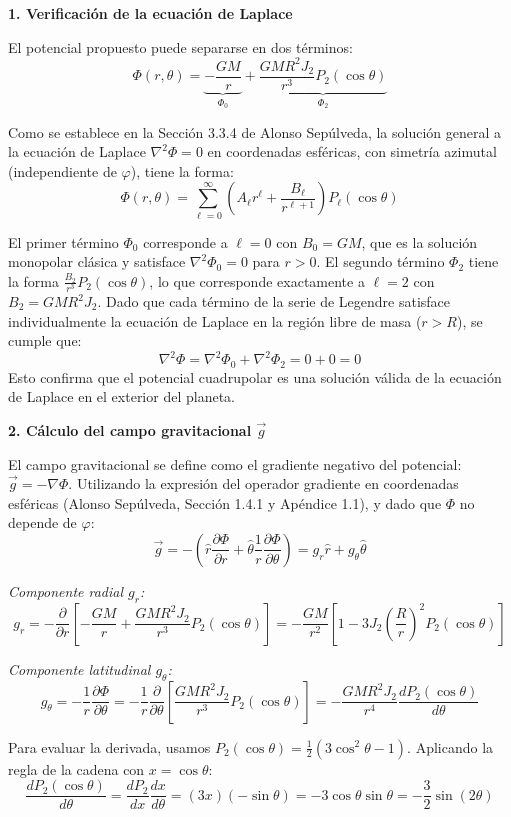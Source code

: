 \documentclass[a4paper]{article}
\begin{document}
\textbf{1. Verificación de la ecuación de Laplace}

El potencial propuesto puede separarse en dos términos:
$$ \Phi(r, \theta) = \underbrace{-\frac{GM}{r}}_{\Phi_0} + \underbrace{\frac{GM R^2 J_2}{r^3} P_2(\cos\theta)}_{\Phi_2} $$

Como se establece en la Sección 3.3.4 de Alonso Sepúlveda, la solución general a la ecuación de Laplace $\nabla^2 \Phi = 0$ en coordenadas esféricas, con simetría azimutal (independiente de $\varphi$), tiene la forma:
$$ \Phi(r, \theta) = \sum_{\ell=0}^{\infty} \left( A_\ell r^\ell + \frac{B_\ell}{r^{\ell+1}} \right) P_\ell(\cos\theta) $$

El primer término $\Phi_0$ corresponde a $\ell=0$ con $B_0 = GM$, que es la solución monopolar clásica y satisface $\nabla^2 \Phi_0 = 0$ para $r > 0$.
El segundo término $\Phi_2$ tiene la forma $\frac{B_2}{r^3} P_2(\cos\theta)$, lo que corresponde exactamente a $\ell=2$ con $B_2 = GM R^2 J_2$. Dado que cada término de la serie de Legendre satisface individualmente la ecuación de Laplace en la región libre de masa ($r > R$), se cumple que:
$$ \nabla^2 \Phi = \nabla^2 \Phi_0 + \nabla^2 \Phi_2 = 0 + 0 = 0 $$
Esto confirma que el potencial cuadrupolar es una solución válida de la ecuación de Laplace en el exterior del planeta.

\textbf{2. Cálculo del campo gravitacional $\vec{g}$}

El campo gravitacional se define como el gradiente negativo del potencial: $\vec{g} = -\nabla \Phi$. Utilizando la expresión del operador gradiente en coordenadas esféricas (Alonso Sepúlveda, Sección 1.4.1 y Apéndice 1.1), y dado que $\Phi$ no depende de $\varphi$:
$$ \vec{g} = -\left( \hat{r} \frac{\partial \Phi}{\partial r} + \hat{\theta} \frac{1}{r} \frac{\partial \Phi}{\partial \theta} \right) = g_r \hat{r} + g_\theta \hat{\theta} $$

\textit{Componente radial $g_r$:}
$$ g_r = -\frac{\partial}{\partial r} \left[ -\frac{GM}{r} + \frac{GM R^2 J_2}{r^3} P_2(\cos\theta) \right] = -\frac{GM}{r^2} \left[ 1 - 3 J_2 \left(\frac{R}{r}\right)^2 P_2(\cos\theta) \right] $$

\textit{Componente latitudinal $g_\theta$:}
$$ g_\theta = -\frac{1}{r} \frac{\partial \Phi}{\partial \theta} = -\frac{1}{r} \frac{\partial}{\partial \theta} \left[ \frac{GM R^2 J_2}{r^3} P_2(\cos\theta) \right] = -\frac{GM R^2 J_2}{r^4} \frac{d P_2(\cos\theta)}{d\theta} $$

Para evaluar la derivada, usamos $P_2(\cos\theta) = \frac{1}{2}(3\cos^2\theta - 1)$. Aplicando la regla de la cadena con $x = \cos\theta$:
$$ \frac{d P_2(\cos\theta)}{d\theta} = \frac{d P_2}{dx} \frac{dx}{d\theta} = (3x)(-\sin\theta) = -3\cos\theta\sin\theta = -\frac{3}{2}\sin(2\theta) $$
\end{document}
